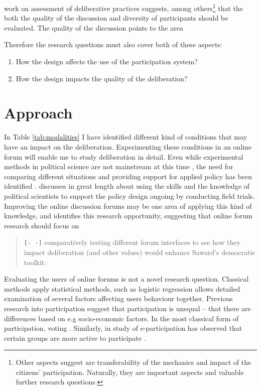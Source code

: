 \documentclass[journal,a4paper]{IEEEtran}
\begin{document}
 work on assessment of deliberative practices suggests, among others\footnote{Other aspects  suggest are transferability of the mechanics and impact of the citizens' participation. Naturally, they are important aspects and valuable further research questions.} that the both the quality of the discussion and diversity of participants should be evaluated. The quality of the discussion points to the area

Therefore the research questions must also cover both of these aspects:

\begin{enumerate}
\item How the design affects the use of the participation system?
\item How the design impacts the quality of the deliberation?
\end{enumerate}

\section{Approach}

In Table \ref{tab:modalities} I have identified different kind of conditions that may have an impact on the deliberation. Experimenting these conditions in an online forum will enable me to study deliberation in detail. Even while experimental methods in political science are not mainstream at this time \cite{green03,druckman06}, the need for comparing different situations and providing support for applied policy has been identified \cite{stoker10}.  discusses in great length about using the skills and the knowledge of political scientists to support the policy design ongoing by conducting field trials. Improving the online discussion forums may be one area of applying this kind of knowledge, and  identifies this research opportunity, suggesting that online forum research should focus on

\begin{quote}
\texttt{[- -]} comparatively testing different forum interfaces to see how they impact deliberation (and other values) would 
enhance Saward’s democratic toolkit.
\end{quote}

Evaluating the users of online forums is not a novel research question. Classical methods apply statistical methods, such as logistic regression allows detailed examination of several factors affecting users behaviour together. Previous research into participation suggest that participation is unequal -- that there are differences based on e.g socio-economic factors. In the most classical form of participation, voting . Similarly, in study of e-participation has observed that certain groups are more active to participate \cite{baek11,albrecht06,strandberg08}.
\end{document}
